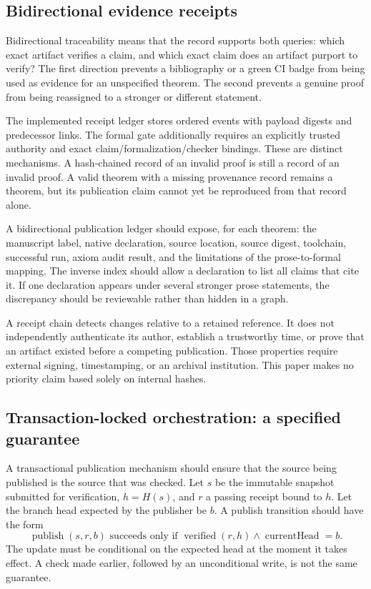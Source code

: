 \documentclass[11pt,reqno]{amsart}
\theoremstyle{definition}
\begin{document}
\subsection{Bidirectional evidence receipts}
Bidirectional traceability means that the record supports both queries:
which exact artifact verifies a claim, and which exact claim does an artifact
purport to verify? The first direction prevents a bibliography or a green CI
badge from being used as evidence for an unspecified theorem. The second
prevents a genuine proof from being reassigned to a stronger or different
statement.

The implemented receipt ledger stores ordered events with payload digests
and predecessor links. The formal gate additionally requires an explicitly
trusted authority and exact claim/formalization/checker bindings. These are
distinct mechanisms. A hash-chained record of an invalid proof is still a
record of an invalid proof. A valid theorem with a missing provenance record
remains a theorem, but its publication claim cannot yet be reproduced from
that record alone.

A bidirectional publication ledger should expose, for each theorem:
the manuscript label, native declaration, source location, source digest,
toolchain, successful run, axiom audit result, and the limitations of the
prose-to-formal mapping. The inverse index should allow a declaration to
list all claims that cite it. If one declaration appears under several
stronger prose statements, the discrepancy should be reviewable rather than
hidden in a graph.

A receipt chain detects changes relative to a retained reference. It does
not independently authenticate its author, establish a trustworthy time,
or prove that an artifact existed before a competing publication. Those
properties require external signing, timestamping, or an archival institution.
This paper makes no priority claim based solely on internal hashes.

\subsection{Transaction-locked orchestration: a specified guarantee}
A transactional publication mechanism should ensure that the source being
published is the source that was checked. Let $s$ be the immutable snapshot
submitted for verification, $h=H(s)$, and $r$ a passing receipt bound to $h$.
Let the branch head expected by the publisher be $b$. A publish transition
should have the form
\begin{equation}\label{eq:publish_guard}
 \operatorname{publish}(s,r,b)\text{ succeeds only if }
 \operatorname{verified}(r,h)\land
 \operatorname{currentHead}=b.
\end{equation}
The update must be conditional on the expected head at the moment it takes
effect. A check made earlier, followed by an unconditional write, is not the
same guarantee.
\end{document}
